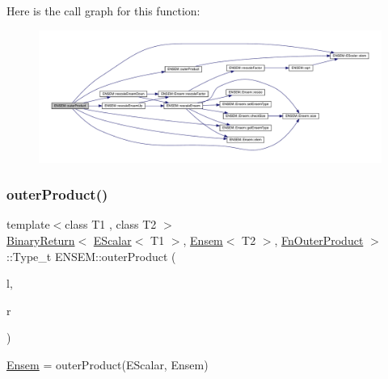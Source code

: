 Here is the call graph for this function\+:\nopagebreak
\begin{figure}[H]
\begin{center}
\leavevmode
\includegraphics[width=350pt]{d1/d9e/group__eensem_ga13dd888cacbe0e5a3c85217eeb2c9002_cgraph}
\end{center}
\end{figure}
\mbox{\label{group__eensem_ga63f92da09e74b21cf1e10e19dbbc9437}} 
\subsubsection{\texorpdfstring{outerProduct()}{outerProduct()}\hspace{0.1cm}{\footnotesize\ttfamily [3/3]}}
{\footnotesize\ttfamily template$<$class T1 , class T2 $>$ \\
\mbox{\hyperlink{structENSEM_1_1BinaryReturn}{Binary\+Return}}$<$ \mbox{\hyperlink{classENSEM_1_1EScalar}{E\+Scalar}}$<$ T1 $>$, \mbox{\hyperlink{classENSEM_1_1Ensem}{Ensem}}$<$ T2 $>$, \mbox{\hyperlink{structENSEM_1_1FnOuterProduct}{Fn\+Outer\+Product}} $>$\+::Type\+\_\+t E\+N\+S\+E\+M\+::outer\+Product (\begin{DoxyParamCaption}\item[{const \mbox{\hyperlink{classENSEM_1_1EScalar}{E\+Scalar}}$<$ T1 $>$ \&}]{l,  }\item[{const \mbox{\hyperlink{classENSEM_1_1Ensem}{Ensem}}$<$ T2 $>$ \&}]{r }\end{DoxyParamCaption})\hspace{0.3cm}{\ttfamily [inline]}}



\mbox{\hyperlink{classENSEM_1_1Ensem}{Ensem}} = outer\+Product(\+E\+Scalar, Ensem) 

